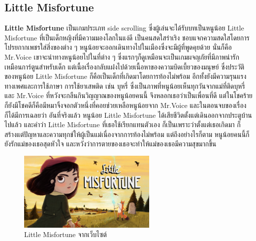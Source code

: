 \subsection{Little Misfortune}
\subsubitem \textbf{Little Misfortune} \cite{outlast:theory} เป็นเกมประเภท side scrolling ซึ่งผู้เล่นจะได้รับบทเป็นหนูน้อย Little Misfortune ที่เป็นเด็กหญิงที่มีความมองโลกในแง่ดี เป็นคนสดใสร่าเริง ชอบแจกความสดใสโดยการโปรยกากเพชรใส่สิ่งของต่าง ๆ หนูน้อยจะออกเดินทางไปในเมืองซึ่งจะมีผู้ที่พูดคุยด้วย นั่นก็คือ Mr.Voice เขาจะนำทางหนูน้อยไปในที่ต่าง ๆ ซึ่งแรกๆก็ดูเหมือนจะเป็นเกมผจญภัยที่มีภาพน่ารักเหมือนการ์ตูนสำหรับเด็ก แต่เนื้อเรื่องกลับแฝงไปด้วยเนื้อหาของความบิดเบี้ยวของมนุษย์ ซึ่งประวัติของหนูน้อย Little Misfortune ก็คือเป็นเด็กที่เกิดมาโดยการท้องไม่พร้อม อีกทั้งยังมีความรุนแรงทางเพศและการใช้ภาษา การใช้ยาเสพติด เช่น บุหรี่ ซึ่งเป็นภาพที่หนูน้อยเห็นทุกวันจากแม่ที่ติดบุหรี่ และ Mr.Voice ที่หวังจะกลืนกินวิญญาณของหนูน้อยคนนี้ จึงหลอกเธอว่าเป็นเพื่อนที่ดี แต่ในโชคร้ายก็ยังมีโชคดีก็คือมีหมาจิ้งจอกตัวหนึ่งที่คอยช่วยเหลือหนูน้อยจาก Mr.Voice และในตอนจบของเรื่องก็ได้มีการเฉลยว่า อันที่จริงแล้ว หนูน้อย Little Misfortune ได้เสียชีวิตตั้งแต่เดินออกจากประตูบ้านไปแล้ว และคำว่า Little Misfortune ที่เธอใช้เรียกแทนตัวเอง ก็เป็นเพราะว่าตั้งแต่เธอเกิดมา ก็สร้างแต่ปัญหาและความทุกข์ให้ผู้เป็นแม่เนื่องจากการท้องไม่พร้อม แต่ถึงอย่างไรก็ตาม หนูน้อยคนนี้ก็ยังรักแม่ของเธอสุดหัวใจ และหวังว่าการตายของเธอจะทำให้แม่ของเธอมีความสุขมากขึ้น
\begin{figure}[h]
  \centering
  \includegraphics[width=0.6\textwidth, height=0.2\textheight]{Images/little_misfortune.jpg}
  \caption{Little Misfortune จากเว็บไซต์}\label{little_misfurtune}
\end{figure}


